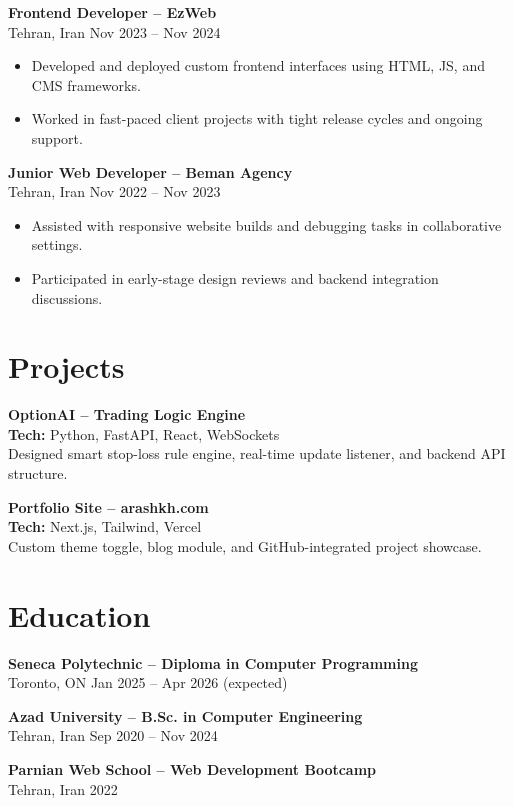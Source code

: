 \documentclass[letterpaper,11pt]{article}
\begin{document}
\textbf{Frontend Developer – EzWeb}\\
Tehran, Iran \hfill Nov 2023 -- Nov 2024
\begin{itemize}[leftmargin=*]
  \item Developed and deployed custom frontend interfaces using HTML, JS, and CMS frameworks.
  \item Worked in fast-paced client projects with tight release cycles and ongoing support.
\end{itemize}

\textbf{Junior Web Developer – Beman Agency}\\
Tehran, Iran \hfill Nov 2022 -- Nov 2023
\begin{itemize}[leftmargin=*]
  \item Assisted with responsive website builds and debugging tasks in collaborative settings.
  \item Participated in early-stage design reviews and backend integration discussions.
\end{itemize}

\section*{Projects}
\textbf{OptionAI – Trading Logic Engine}\\
\textbf{Tech:} Python, FastAPI, React, WebSockets\\
Designed smart stop-loss rule engine, real-time update listener, and backend API structure.

\textbf{Portfolio Site – arashkh.com}\\
\textbf{Tech:} Next.js, Tailwind, Vercel\\
Custom theme toggle, blog module, and GitHub-integrated project showcase.

\section*{Education}
\textbf{Seneca Polytechnic – Diploma in Computer Programming}\\
Toronto, ON \hfill Jan 2025 -- Apr 2026 (expected)

\textbf{Azad University – B.Sc. in Computer Engineering}\\
Tehran, Iran \hfill Sep 2020 -- Nov 2024

\textbf{Parnian Web School – Web Development Bootcamp}\\
Tehran, Iran \hfill 2022
\end{document}
